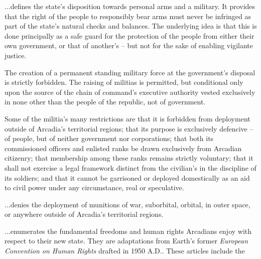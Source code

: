 \item %

...defines the state's disposition towards personal arms and a military. It provides that the right of the people to responsibly bear arms must never be infringed as part of the state's natural checks and balances. The underlying idea is that this is done principally as a safe guard for the protection of the people from either their own government, or that of another's -- but not for the sake of enabling vigilante justice.

The creation of a permanent standing military force at the government's disposal is strictly forbidden. The raising of militias is permitted, but conditional only upon the source of the chain of command's executive authority vested exclusively in none other than the people of the republic, not of government. 

Some of the militia's many restrictions are that it is forbidden from deployment outside of Arcadia's territorial regions; that its purpose is exclusively defencive -- of people, but of neither government nor corporations; that both its commissioned officers and enlisted ranks be drawn exclusively from Arcadian citizenry; that membership among these ranks remains strictly voluntary; that it shall not exercise a legal framework distinct from the civilian's in the discipline of its soldiers; and that it cannot be garrisoned or deployed domestically as an aid to civil power under any circumstance, real or speculative.

\item %

...denies the deployment of munitions of war, suborbital, orbital, in outer space, or anywhere outside of Arcadia's territorial regions.
\stoparticle

\startarticle[start=11]
\item %

...enumerates the fundamental freedoms and human rights Arcadians enjoy with respect to their new state. They are adaptations from Earth's former {\it European Convention on Human Rights} drafted in 1950 A.D.. These articles include the

